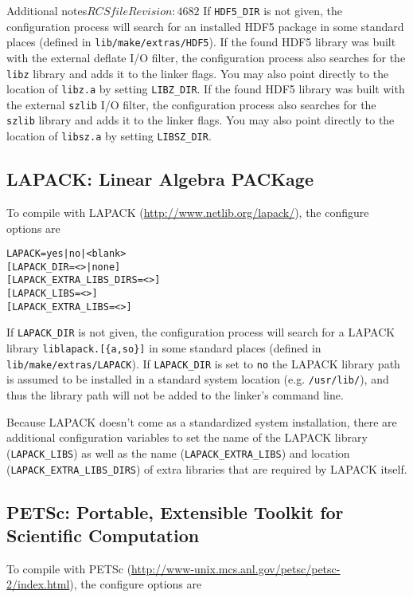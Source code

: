 \begin{cactuspart}{Additional notes}{$RCSfile$}{$Revision: 4682 $}
If \texttt{HDF5\_DIR} is not given, the configuration process will search for an
installed HDF5 package in some standard places (defined in
\texttt{lib/make/extras/HDF5}).
If the found HDF5 library was built with the external deflate I/O filter,
the configuration process also searches for the \texttt{libz} library and adds
it to the linker flags. You may also point directly to the location of
\texttt{libz.a} by setting \texttt{LIBZ\_DIR}.
If the found HDF5 library was built with the external \texttt{szlib} I/O filter,
the configuration process also searches for the \texttt{szlib} library and adds
it to the linker flags. You may also point directly to the location of
\texttt{libsz.a} by setting \texttt{LIBSZ\_DIR}.


\subsection{LAPACK: Linear Algebra PACKage}

To compile with LAPACK (\url{http://www.netlib.org/lapack/}),
the configure options are

\begin{alltt}
LAPACK = yes | no | <blank>
[ LAPACK\_DIR = <> | none ]
[ LAPACK\_EXTRA\_LIBS\_DIRS = <> ]
[ LAPACK\_LIBS = <> ]
[ LAPACK\_EXTRA\_LIBS = <> ]
\end{alltt}

If \texttt{LAPACK\_DIR} is not given, the configuration process will search for a
LAPACK library \texttt{liblapack.[\{a,so\}]} in some standard places (defined in
\texttt{lib/make/extras/LAPACK}). If \texttt{LAPACK\_DIR} is set to \texttt{no}
the LAPACK library path is assumed to be installed in a standard system location
(e.g. \texttt{/usr/lib/}), and thus the library path will not be added to the
linker's command line.

Because LAPACK doesn't come as a standardized system installation, there are
additional configuration variables to set the name of the LAPACK library
(\texttt{LAPACK\_LIBS}) as well as the name (\texttt{LAPACK\_EXTRA\_LIBS}) and
location (\texttt{LAPACK\_EXTRA\_LIBS\_DIRS}) of extra libraries that are
required by LAPACK itself.


\subsection{PETSc: Portable, Extensible Toolkit for Scientific Computation}

To compile with PETSc
(\url{http://www-unix.mcs.anl.gov/petsc/petsc-2/index.html}),
the configure options are


\end{cactuspart}
